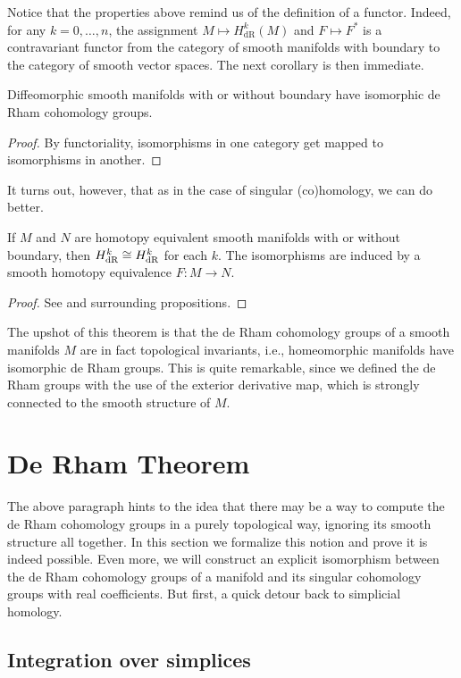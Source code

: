 \documentclass[a4paper, 12pt]{article}
\begin{document}
Notice that the properties above remind us of the definition of a functor.
Indeed, for any $k = 0,\dots,n$, the assignment $M \mapsto H_{\text{dR}}^k(M)$ and $F \mapsto F^*$
is a contravariant functor from the category of smooth manifolds with boundary to the category of smooth vector spaces.
The next corollary is then immediate.
\begin{corollary}
    Diffeomorphic smooth manifolds with or without boundary have isomorphic de Rham cohomology groups.
\end{corollary}
\begin{proof}
    By functoriality, isomorphisms in one category get mapped to isomorphisms in another.
\end{proof}
It turns out, however, that as in the case of singular (co)homology, we can do better.
\begin{theorem}
    If $M$ and $N$ are homotopy equivalent smooth manifolds with or without boundary,
    then $H_{\text{dR}}^k \cong H_{\text{dR}}^k$ for each $k$.
    The isomorphisms are induced by a smooth homotopy equivalence $F \colon M \to N$.
\end{theorem}
\begin{proof}
    See \cite[Thm. 17.11]{Lee2012} and surrounding propositions.
\end{proof}
The upshot of this theorem is that the de Rham cohomology groups of a smooth manifolds $M$ are
in fact topological invariants, i.e., homeomorphic manifolds have isomorphic de Rham groups.
This is quite remarkable, since we defined the de Rham groups with the use of the exterior derivative map,
which is strongly connected to the smooth structure of $M$.

\section{De Rham Theorem}

The above paragraph hints to the idea that there may be a way to compute the de
Rham cohomology groups in a purely topological way, ignoring its smooth
structure all together. In this section we formalize this notion and prove it
is indeed possible. Even more, we will construct an explicit isomorphism between
the de Rham cohomology groups of a manifold and its singular cohomology groups
with real coefficients.
But first, a quick detour back to simplicial homology.

\subsection{Integration over simplices}
\end{document}
